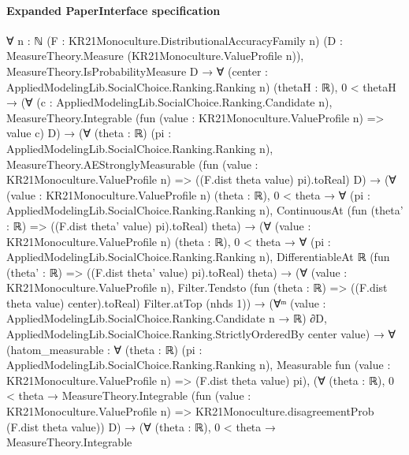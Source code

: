 \documentclass[10pt]{article}
\begin{document}
\paragraph{Expanded PaperInterface specification}
\begin{ReviewVerbatim}
∀ {n : ℕ} (F : KR21Monoculture.DistributionalAccuracyFamily n)
  (D : MeasureTheory.Measure (KR21Monoculture.ValueProfile n)),
  MeasureTheory.IsProbabilityMeasure D →
    ∀ (center : AppliedModelingLib.SocialChoice.Ranking.Ranking n) (thetaH : ℝ),
      0 < thetaH →
        (∀ (c : AppliedModelingLib.SocialChoice.Ranking.Candidate n),
            MeasureTheory.Integrable (fun (value : KR21Monoculture.ValueProfile n) => value c) D) →
          (∀ (theta : ℝ) (pi : AppliedModelingLib.SocialChoice.Ranking.Ranking n),
              MeasureTheory.AEStronglyMeasurable
                (fun (value : KR21Monoculture.ValueProfile n) => ((F.dist theta value) pi).toReal) D) →
            (∀ (value : KR21Monoculture.ValueProfile n) (theta : ℝ),
                0 < theta →
                  ∀ (pi : AppliedModelingLib.SocialChoice.Ranking.Ranking n),
                    ContinuousAt (fun (theta' : ℝ) => ((F.dist theta' value) pi).toReal) theta) →
              (∀ (value : KR21Monoculture.ValueProfile n) (theta : ℝ),
                  0 < theta →
                    ∀ (pi : AppliedModelingLib.SocialChoice.Ranking.Ranking n),
                      DifferentiableAt ℝ (fun (theta' : ℝ) => ((F.dist theta' value) pi).toReal) theta) →
                (∀ (value : KR21Monoculture.ValueProfile n),
                    Filter.Tendsto (fun (theta : ℝ) => ((F.dist theta value) center).toReal) Filter.atTop (nhds 1)) →
                  (∀ᵐ (value : AppliedModelingLib.SocialChoice.Ranking.Candidate n → ℝ) ∂D,
                      AppliedModelingLib.SocialChoice.Ranking.StrictlyOrderedBy center value) →
                    ∀
                      (hatom_measurable :
                        ∀ (theta : ℝ) (pi : AppliedModelingLib.SocialChoice.Ranking.Ranking n),
                          Measurable fun (value : KR21Monoculture.ValueProfile n) => (F.dist theta value) pi),
                      (∀ (theta : ℝ),
                          0 < theta →
                            MeasureTheory.Integrable
                              (fun (value : KR21Monoculture.ValueProfile n) =>
                                KR21Monoculture.disagreementProb (F.dist theta value))
                              D) →
                        (∀ (theta : ℝ),
                            0 < theta →
                              MeasureTheory.Integrable

\end{ReviewVerbatim}
\end{document}
